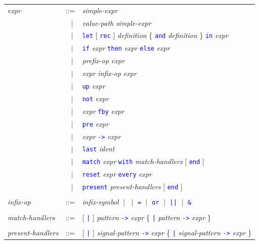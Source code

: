 \documentclass[11pt,titlepage,twoside]{report}
\newcommand{\alt}{\;|\;}
\newcommand{\Let}{\mbox{{\tt let}}}
\newcommand{\Rec}{\mbox{{\tt rec}}}
\newcommand{\In}{\mbox{{\tt in}}}
\newcommand{\AND}{\mbox{{\tt and}}}
\newcommand{\Fun}{\mbox{{\tt fun}}}
\newcommand{\Function}{\mbox{{\tt function}}}
\newcommand{\If}{\mbox{{\tt if}}}
\newcommand{\Then}{\mbox{{\tt then}}}
\newcommand{\Else}{\mbox{{\tt else}}}
\newcommand{\Not}{\mbox{{\tt not}}}
\newcommand{\Up}{\mbox{{\tt up}}}
\newcommand{\Pre}{\mbox{{\tt pre}}}
\newcommand{\Last}{\mbox{{\tt last}}}
\newcommand{\Run}{\mbox{{\tt run}}}
\newcommand{\Fby}{\mbox{{\tt fby}}}
\newcommand{\Minusgreater}{\mbox{{\tt ->}}}
\renewcommand{\Reset}{\mbox{{\tt reset}}}
\newcommand{\Every}{\mbox{{\tt every}}}
\newcommand{\End}{\mbox{{\tt end}}}
\newcommand{\Match}[2]{\mbox{\tt match}\ #1\ \mbox{\tt with}\ #2 \End}
\newcommand{\term}[1]{\textcolor{Blue}{\tt #1}}
\newcommand{\nterm}[1]{\textcolor{BrickRed}{\it #1}}
\newcommand{\term}[1]{{\tt #1}}
\newcommand{\nterm}[1]{{\em #1}}
\begin{document}
\begin{center}
\begin{tabular}{lcl}
\nterm{expr}
   & ::=        & \nterm{simple-expr} \\
   & $\;\;\alt$ & \nterm{value-path} \nterm{simple-expr} \\
   & $\;\;\alt$ & \term{\Let} [ \term{\Rec} ] \nterm{definition}
                  \{ \term{\AND} \nterm{definition} \} \term{\In} 
                  \nterm{expr} \\
   & $\;\;\alt$ & \term{\If} \nterm{expr} \term{\Then} \nterm{expr}
                  \term{\Else} \nterm{expr} \\
   & $\;\;\alt$ & \nterm{prefix-op} \nterm{expr} \\
   & $\;\;\alt$ & \nterm{expr} \nterm{infix-op} \nterm{expr} \\
   & $\;\;\alt$ & \term{\Up} \nterm{expr} \\
   & $\;\;\alt$ & \term{\Not} \nterm{expr} \\
      & $\;\;\alt$ & \nterm{expr} \term{\Fby} \nterm{expr} \\
   & $\;\;\alt$ & \term{\Pre} \nterm{expr} \\
   & $\;\;\alt$ & \nterm{expr} \term{\Minusgreater} \nterm{expr} \\
   & $\;\;\alt$ & \term{\Last} \nterm{ident} \\
   & $\;\;\alt$ & \term{match} \nterm{expr} \term{with} 
                  \nterm{match-handlers} [ \term{end} ] \\
   & $\;\;\alt$ & \term{reset} \nterm{expr} \term{every} \nterm{expr} \\ 
   & $\;\;\alt$ & \term{present} \nterm{present-handlers} [ \term{end} ]
\\ \\
\nterm{infix-op}                
& ::=        &
                \nterm{infix-symbol} 
                $\alt$ \term{*} 
                $\alt$ \term{=} 
                $\alt$ \term{or}
                $\alt$ \term{||}  
                $\alt$ \term{\&}
\\
\\
\nterm{match-handlers}
   & ::=        & [ \term{|} ] 
                  \nterm{pattern} \term{\Minusgreater} \nterm{expr}
                  \{ \term{|} 
                  \nterm{pattern} \term{\Minusgreater} \nterm{expr} \}
\\
\\
\nterm{present-handlers}
   & ::=        & [ \term{|} ] 
                  \nterm{signal-pattern} \term{->} \nterm{expr}
                  \{ \term{|}
                  \nterm{signal-pattern} \term{->} \nterm{expr} \} 
\end{tabular}
\end{center}
\end{document}

